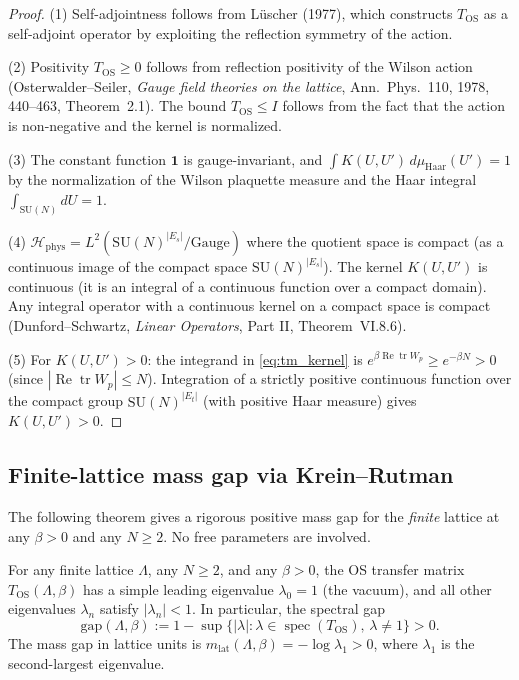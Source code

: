 \begin{proof}
(1) Self-adjointness follows from L\"uscher (1977), which constructs $T_{\mathrm{OS}}$
as a self-adjoint operator by exploiting the reflection symmetry of the action.

(2) Positivity $T_{\mathrm{OS}}\ge 0$ follows from reflection positivity of the
Wilson action (Osterwalder--Seiler, \emph{Gauge field theories on the lattice},
Ann.~Phys.~110, 1978, 440--463, Theorem~2.1). The bound $T_{\mathrm{OS}}\le I$
follows from the fact that the action is non-negative and the kernel is normalized.

(3) The constant function $\mathbf{1}$ is gauge-invariant, and
$\int K(U,U')\,d\mu_{\mathrm{Haar}}(U') = 1$ by the normalization of the
Wilson plaquette measure and the Haar integral $\int_{\mathrm{SU}(N)}dU=1$.

(4) $\mathcal{H}_{\mathrm{phys}} = L^{2}(\mathrm{SU}(N)^{|E_{s}|}/\mathrm{Gauge})$
where the quotient space is compact (as a continuous image of the compact space
$\mathrm{SU}(N)^{|E_{s}|}$). The kernel $K(U,U')$ is continuous (it is an
integral of a continuous function over a compact domain). Any integral operator
with a continuous kernel on a compact space is compact (Dunford--Schwartz,
\emph{Linear Operators}, Part II, Theorem~VI.8.6).

(5) For $K(U,U')>0$: the integrand in \eqref{eq:tm_kernel} is
$e^{\beta\operatorname{Re}\operatorname{tr}W_{p}}\ge e^{-\beta N}>0$
(since $|\operatorname{Re}\operatorname{tr}W_{p}|\le N$). Integration of a
strictly positive continuous function over the compact group $\mathrm{SU}(N)^{|E_{t}|}$
(with positive Haar measure) gives $K(U,U')>0$.
\end{proof}

\subsection{Finite-lattice mass gap via Krein--Rutman}
\label{ssec:pf_finite_lattice}

The following theorem gives a rigorous positive mass gap for the \emph{finite}
lattice at any $\beta>0$ and any $N\ge 2$.  No free parameters are involved.

\begin{theorem}
\label{thm:finite_lattice_mass_gap}
For any finite lattice $\Lambda$, any $N\ge 2$, and any $\beta>0$, the OS
transfer matrix $T_{\mathrm{OS}}(\Lambda,\beta)$ has a simple leading eigenvalue
$\lambda_{0}=1$ (the vacuum), and all other eigenvalues $\lambda_{n}$ satisfy
$|\lambda_{n}|<1$. In particular, the spectral gap
\[
\mathrm{gap}(\Lambda,\beta)
:= 1-\sup\{|\lambda| : \lambda\in\operatorname{spec}(T_{\mathrm{OS}}),\,\lambda\ne 1\}>0.
\]
The mass gap in lattice units is $m_{\mathrm{lat}}(\Lambda,\beta)=-\log\lambda_{1}>0$,
where $\lambda_{1}$ is the second-largest eigenvalue.
\end{theorem}

